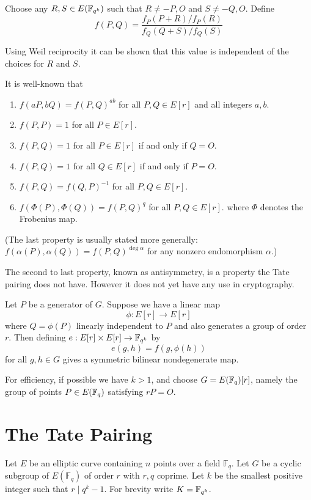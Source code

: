 Choose any $R, S \in E(\mathbb{F}_{q^k})$ such that $R \ne -P, O$ and $S \ne -Q, O$.
Define
\[ f(P,Q) = \frac{f_P(P+R)/f_P(R)}{f_Q(Q+S)/f_Q(S)} \]

Using Weil reciprocity it can be shown that this value is independent
of the choices for $R$ and $S$.

It is well-known that
\begin{enumerate}
\item
$f(a P, b Q) = f(P,Q)^{a b}$ for all $P, Q \in E[r]$ and all integers $a, b$.
\item
$f(P,P) = 1$ for all $P \in E[r]$.
\item
$f(P,Q) = 1$ for all $P \in E[r]$ if and only if $Q = O$.
\item
$f(P,Q) = 1$ for all $Q \in E[r]$ if and only if $P = O$.
\item
$f(P,Q) = f(Q,P)^{-1}$ for all $P,Q \in E[r]$.
\item
$f(\Phi(P),\Phi(Q)) = f(P,Q)^{q}$ for all $P,Q \in E[r]$.
where $\Phi$ denotes the Frobenius map.
\end{enumerate}

(The last property is usually stated more generally:
$f(\alpha(P),\alpha(Q)) = f(P,Q)^{\deg \alpha}$ for any nonzero
endomorphism $\alpha$.)

The second to last property, known as antisymmetry, is a property the
Tate pairing does not have. However it does not yet have
any use in cryptography.

Let $P$ be a generator of $G$. Suppose
we have a linear map
\[ \phi : E[r] \rightarrow E[r] \]
where $Q = \phi(P)$ linearly independent to $P$ and also generates
a group of order $r$.
Then defining $e:E[r]\times E[r]\rightarrow \mathbb{F}_{q^k}$ by
\[ e(g,h) = f(g,\phi(h)) \]
for all $g, h \in G$
gives a symmetric bilinear nondegenerate map.

For efficiency, if possible we have $k > 1$, and choose
$G = E(\mathbb{F}_q)[r]$, namely the
group of points $P \in E(\mathbb{F}_q)$ satisfying $r P = O$.

\section {The Tate Pairing }

Let $E$ be an elliptic curve containing $n$ points over a field $\mathbb{F}_q$.
Let $G$ be a cyclic subgroup of $E(\mathbb{F}_q)$ of order $r$ with $r, q$
coprime. Let $k$ be the smallest positive integer such that $r \mid q^k - 1$.
For brevity write $K = \mathbb{F}_{q^k}$.

